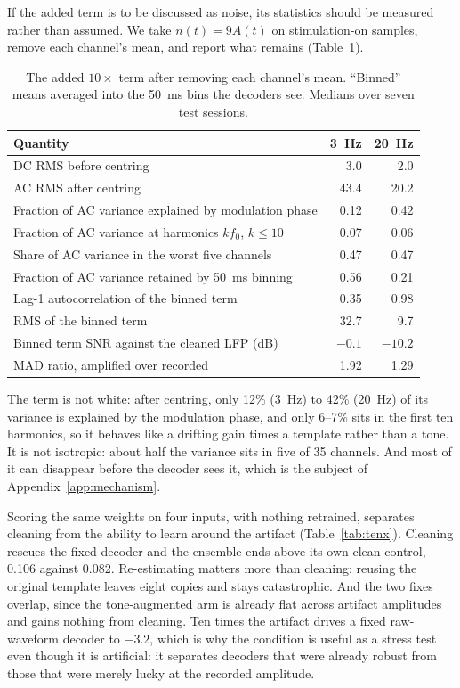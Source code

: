 \documentclass[11pt]{article}
\begin{document}
If the added term is to be discussed as noise, its statistics should be measured rather than
assumed. We take $n(t)=9A(t)$ on stimulation-on samples, remove each channel's mean, and
report what remains (Table~\ref{tab:noise}).

\begin{table}[h]
\centering
\small
\caption{The added $10\times$ term after removing each channel's mean. ``Binned'' means
averaged into the 50~ms bins the decoders see. Medians over seven test sessions.}
\label{tab:noise}
\begin{tabular}{@{}lrr@{}}
\toprule
Quantity & 3~Hz & 20~Hz \\
\midrule
DC RMS before centring                  & 3.0  & 2.0 \\
AC RMS after centring                  & 43.4 & 20.2 \\
Fraction of AC variance explained by modulation phase & 0.12 & 0.42 \\
Fraction of AC variance at harmonics $k f_0$, $k\le10$ & 0.07 & 0.06 \\
Share of AC variance in the worst five channels & 0.47 & 0.47 \\
\midrule
Fraction of AC variance retained by 50~ms binning & 0.56 & 0.21 \\
Lag-1 autocorrelation of the binned term & 0.35 & 0.98 \\
RMS of the binned term                 & 32.7 & 9.7 \\
Binned term SNR against the cleaned LFP (dB) & $-0.1$ & $-10.2$ \\
MAD ratio, amplified over recorded     & 1.92 & 1.29 \\
\bottomrule
\end{tabular}
\end{table}

The term is not white: after centring, only 12\% (3~Hz) to 42\% (20~Hz) of its variance is
explained by the modulation phase, and only 6--7\% sits in the first ten harmonics, so it
behaves like a drifting gain times a template rather than a tone. It is not isotropic: about
half the variance sits in five of 35 channels. And most of it can disappear before the decoder
sees it, which is the subject of Appendix~\ref{app:mechanism}.

Scoring the same weights on four inputs, with nothing retrained, separates cleaning from the
ability to learn around the artifact (Table~\ref{tab:tenx}). Cleaning rescues the fixed
decoder and the ensemble ends above its own clean control, 0.106 against 0.082. Re-estimating
matters more than cleaning: reusing the original template leaves eight copies and stays
catastrophic. And the two fixes overlap, since the tone-augmented arm is already flat across
artifact amplitudes and gains nothing from cleaning. Ten times the artifact drives a fixed
raw-waveform decoder to $-3.2$, which is why the condition is useful as a stress test even
though it is artificial: it separates decoders that were already robust from those that were
merely lucky at the recorded amplitude.
\end{document}
